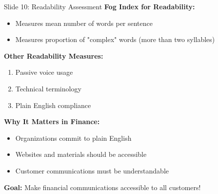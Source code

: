 \documentclass[8pt]{beamer}
\begin{document}
	\begin{frame}{Slide 10: Readability Assessment}
		\fontsize{6.5}{7.5}\selectfont
		\textbf{Fog Index for Readability:}
		\begin{itemize}
			\item Measures mean number of words per sentence
			\item Measures proportion of "complex" words (more than two syllables)
		\end{itemize}
		
		\vspace{0.1cm}
		\textbf{Other Readability Measures:}
		\begin{enumerate}
			\item Passive voice usage
			\item Technical terminology
			\item Plain English compliance
		\end{enumerate}
		
		\vspace{0.1cm}
		\textbf{Why It Matters in Finance:}
		\begin{itemize}
			\item Organizations commit to plain English
			\item Websites and materials should be accessible
			\item Customer communications must be understandable
		\end{itemize}
		
		\textcolor{myblue}{\textbf{Goal:}} Make financial communications accessible to all customers!
	\end{frame}
	
	
\end{document}
